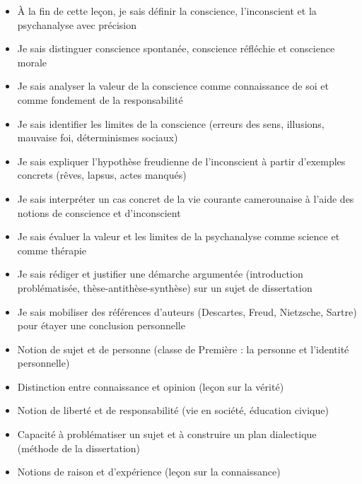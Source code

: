 \documentclass[11pt]{article}
\begin{document}
\begin{objectifs}
\begin{itemize}
\item À la fin de cette leçon, je sais définir la conscience, l'inconscient et la psychanalyse avec précision
\item Je sais distinguer conscience spontanée, conscience réfléchie et conscience morale
\item Je sais analyser la valeur de la conscience comme connaissance de soi et comme fondement de la responsabilité
\item Je sais identifier les limites de la conscience (erreurs des sens, illusions, mauvaise foi, déterminismes sociaux)
\item Je sais expliquer l'hypothèse freudienne de l'inconscient à partir d'exemples concrets (rêves, lapsus, actes manqués)
\item Je sais interpréter un cas concret de la vie courante camerounaise à l'aide des notions de conscience et d'inconscient
\item Je sais évaluer la valeur et les limites de la psychanalyse comme science et comme thérapie
\item Je sais rédiger et justifier une démarche argumentée (introduction problématisée, thèse-antithèse-synthèse) sur un sujet de dissertation
\item Je sais mobiliser des références d'auteurs (Descartes, Freud, Nietzsche, Sartre) pour étayer une conclusion personnelle
\end{itemize}
\end{objectifs}

\begin{prerequis}
\begin{itemize}
\item Notion de sujet et de personne (classe de Première : la personne et l'identité personnelle)
\item Distinction entre connaissance et opinion (leçon sur la vérité)
\item Notion de liberté et de responsabilité (vie en société, éducation civique)
\item Capacité à problématiser un sujet et à construire un plan dialectique (méthode de la dissertation)
\item Notions de raison et d'expérience (leçon sur la connaissance)
\end{itemize}
\end{prerequis}

\newpage
\end{document}
